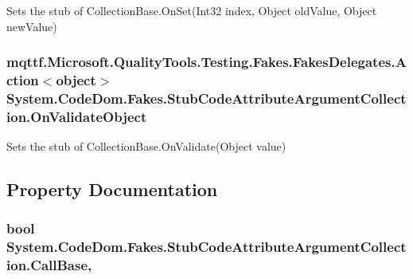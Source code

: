 Sets the stub of Collection\-Base.\-On\-Set(\-Int32 index, Object old\-Value, Object new\-Value)

\hypertarget{class_system_1_1_code_dom_1_1_fakes_1_1_stub_code_attribute_argument_collection_a033af79caed66f6c9c4407a67eccc18b}{
\subsubsection[{On\-Validate\-Object}]{\setlength{\rightskip}{0pt plus 5cm}mqttf.\-Microsoft.\-Quality\-Tools.\-Testing.\-Fakes.\-Fakes\-Delegates.\-Action$<$object$>$ System.\-Code\-Dom.\-Fakes.\-Stub\-Code\-Attribute\-Argument\-Collection.\-On\-Validate\-Object}}\label{class_system_1_1_code_dom_1_1_fakes_1_1_stub_code_attribute_argument_collection_a033af79caed66f6c9c4407a67eccc18b}


Sets the stub of Collection\-Base.\-On\-Validate(\-Object value)



\subsection{Property Documentation}
\hypertarget{class_system_1_1_code_dom_1_1_fakes_1_1_stub_code_attribute_argument_collection_a7a2e2bdb4d8723e7ce05f3818e2a637a}{
\subsubsection[{Call\-Base}]{\setlength{\rightskip}{0pt plus 5cm}bool System.\-Code\-Dom.\-Fakes.\-Stub\-Code\-Attribute\-Argument\-Collection.\-Call\-Base\hspace{0.3cm}{\ttfamily [get]}, {\ttfamily [set]}}}\label{class_system_1_1_code_dom_1_1_fakes_1_1_stub_code_attribute_argument_collection_a7a2e2bdb4d8723e7ce05f3818e2a637a}


